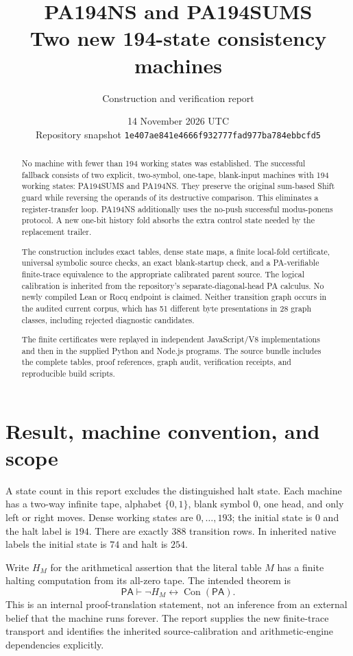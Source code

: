 \documentclass[11pt,a4paper]{article}
\title{PA194NS and PA194SUMS\\Two new 194-state consistency machines}
\author{Construction and verification report}
\date{14 November 2026 UTC\\Repository snapshot
\texttt{1e407ae841e4666f932777fad977ba784ebbcfd5}}
\newcommand{\PA}{\mathsf{PA}}
\newcommand{\Con}{\operatorname{Con}}
\begin{document}
\maketitle
\begin{abstract}
No machine with fewer than 194 working states was established. The successful
fallback consists of two explicit, two-symbol, one-tape, blank-input machines
with 194 working states: PA194SUMS and PA194NS. They preserve the original
sum-based Shift guard while reversing the operands of its destructive
comparison. This eliminates a register-transfer loop. PA194NS additionally
uses the no-push successful modus-ponens protocol. A new one-bit history fold
absorbs the extra control state needed by the replacement trailer.

The construction includes exact tables, dense state maps, a finite local-fold
certificate, universal symbolic source checks, an exact blank-startup check,
and a PA-verifiable finite-trace equivalence to the appropriate calibrated
parent source. The logical calibration is inherited from the repository's
separate-diagonal-head PA calculus. No newly compiled Lean or Rocq endpoint
is claimed. Neither transition graph occurs in the audited current corpus,
which has 51 different byte presentations in 28 graph classes, including
rejected diagnostic candidates.

The finite certificates were replayed in independent JavaScript/V8
implementations and then in the supplied Python and Node.js programs.
The source bundle includes the complete tables, proof references, graph
audit, verification receipts, and reproducible build scripts.
\end{abstract}
\tableofcontents

\section{Result, machine convention, and scope}
A state count in this report excludes the distinguished halt state. Each
machine has a two-way infinite tape, alphabet $\{0,1\}$, blank symbol $0$,
one head, and only left or right moves. Dense working states are
$0,\ldots,193$; the initial state is $0$ and the halt label is $194$.
There are exactly $388$ transition rows. In inherited native labels the
initial state is $74$ and halt is $254$.

Write $H_M$ for the arithmetical assertion that the literal table $M$ has a
finite halting computation from its all-zero tape. The intended theorem is
\[
 \PA\vdash \neg H_M\longleftrightarrow\Con(\PA).
\]
This is an internal proof-translation statement, not an inference from an
external belief that the machine runs forever. The report supplies the new
finite-trace transport and identifies the inherited source-calibration and
arithmetic-engine dependencies explicitly.
\end{document}
